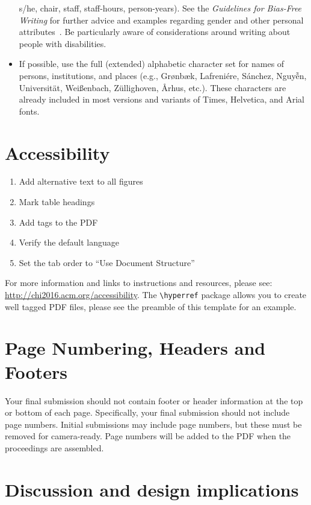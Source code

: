 \documentclass[chi_draft]{sigchi}
\begin{document}
\begin{itemize}
  s/he, chair, staff, staff-hours, person-years). See the
  \textit{Guidelines for Bias-Free Writing} for further advice and
  examples regarding gender and other personal
  attributes~\cite{Schwartz:1995:GBF}. Be particularly aware of
  considerations around writing about people with disabilities.
\item If possible, use the full (extended) alphabetic character set
  for names of persons, institutions, and places (e.g.,
  Gr{\o}nb{\ae}k, Lafreni\'ere, S\'anchez, Nguy{\~{\^{e}}}n,
  Universit{\"a}t, Wei{\ss}enbach, Z{\"u}llighoven, \r{A}rhus, etc.).
  These characters are already included in most versions and variants
  of Times, Helvetica, and Arial fonts.
\end{itemize}

\section{Accessibility}

\begin{enumerate}
\item Add alternative text to all figures
\item Mark table headings
\item Add tags to the PDF
\item Verify the default language
\item Set the tab order to ``Use Document Structure''
\end{enumerate}
For more information and links to instructions and resources, please
see: \url{http://chi2016.acm.org/accessibility}.  The
\texttt{{\textbackslash}hyperref} package allows you to create well tagged PDF files,
please see the preamble of this template for an example.

\section{Page Numbering, Headers and Footers}
Your final submission should not contain footer or header information
at the top or bottom of each page. Specifically, your final submission
should not include page numbers. Initial submissions may include page
numbers, but these must be removed for camera-ready. Page numbers will
be added to the PDF when the proceedings are assembled.

\section{Discussion and design implications}
\end{document}
